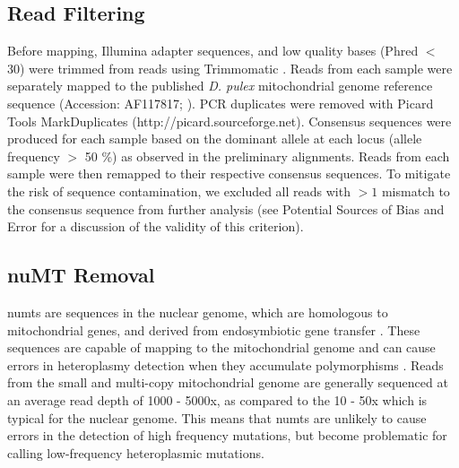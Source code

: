 \documentclass[12pt,twoside]{reedthesis}
\begin{document}
\subsection{Read Filtering}
Before mapping, Illumina adapter sequences, and low quality bases (Phred $<$ 30) were trimmed from reads using Trimmomatic \citep{bolger_trimmomatic:_2014}. %
Reads from each sample were separately mapped to the published \textit{D. pulex} mitochondrial genome reference sequence (Accession: AF117817; \citealp{crease_complete_1999}).
PCR duplicates were removed with Picard Tools MarkDuplicates (http://picard.sourceforge.net).
Consensus sequences were produced for each sample based on the dominant allele at each locus (allele frequency $>$ 50 \%) as observed in the preliminary alignments.
Reads from each sample were then remapped to their respective consensus sequences.
To mitigate the risk of sequence contamination, we excluded all reads with $>1$ mismatch to the consensus sequence from further analysis (see Potential Sources of Bias and Error for a discussion of the validity of this criterion).

\subsection{nuMT Removal}
\gls{numts} are sequences in the nuclear genome, which are homologous to mitochondrial genes, and derived from endosymbiotic gene transfer \citep{bensasson_mitochondrial_2001}.
These sequences are capable of mapping to the mitochondrial genome and can cause errors in heteroplasmy detection when they accumulate polymorphisms \citep{parr_pseudo-mitochondrial_2006}.
Reads from the small and multi-copy mitochondrial genome are generally sequenced at an average read depth of 1000 - 5000x, as compared to the 10 - 50x which is typical for the nuclear genome.
This means that \gls{numts} are unlikely to cause errors in the detection of high frequency mutations, but become problematic for calling low-frequency heteroplasmic mutations.
\end{document}
